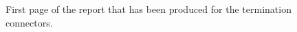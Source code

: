 \begin{figure}[ht]
    \centering
    \caption{First page of the report that has been produced for the termination connectors.}
    \label{figTERMCONNreport}
\end{figure}

